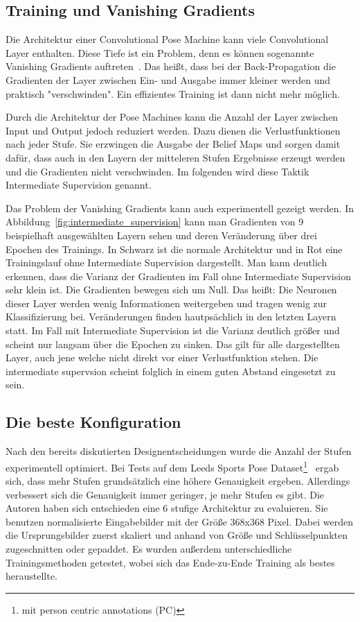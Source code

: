 \documentclass[journal, a4paper]{IEEEtran}
\begin{document}
\subsection{Training und Vanishing Gradients} \label{subsec:vanishing_gradients}

        Die Architektur einer Convolutional Pose Machine kann viele Convolutional Layer enthalten. Diese Tiefe ist ein Problem, denn es können sogenannte Vanishing Gradients auftreten~\cite{pascanu2013difficulty}. Das heißt, dass bei der Back-Propagation die Gradienten der Layer zwischen Ein- und Ausgabe immer kleiner werden und praktisch "verschwinden". Ein effizientes Training ist dann nicht mehr möglich.

        Durch die Architektur der Pose Machines kann die Anzahl der Layer zwischen Input und Output jedoch reduziert werden. Dazu dienen die Verlustfunktionen nach jeder Stufe. Sie erzwingen die Ausgabe der Belief Maps und sorgen damit dafür, dass auch in den Layern der mitteleren Stufen Ergebnisse erzeugt werden und die Gradienten nicht verschwinden. Im folgenden wird diese Taktik Intermediate Supervision genannt.

        Das Problem der Vanishing Gradients kann auch experimentell gezeigt werden. In Abbildung~\ref{fig:intermediate_supervision} kann man Gradienten von 9 beispielhaft ausgewählten Layern sehen und deren Veränderung über drei Epochen des Trainings. In Schwarz ist die normale Architektur und in Rot eine Trainingslauf ohne Intermediate Supervision dargestellt. Man kann deutlich erkennen, dass die Varianz der Gradienten im Fall ohne Intermediate Supervision sehr klein ist. Die Gradienten bewegen sich um Null. Das heißt: Die Neuronen dieser Layer werden wenig Informationen weitergeben und tragen wenig zur Klassifizierung bei. Veränderungen finden hautpsächlich in den letzten Layern statt. Im Fall mit Intermediate Supervision ist die Varianz deutlich größer und scheint nur langsam über die Epochen zu sinken. Das gilt für alle dargestellten Layer, auch jene welche nicht direkt vor einer Verlustfunktion stehen. Die intermediate supervsion scheint folglich in einem guten Abstand eingesetzt zu sein.

\subsection{Die beste Konfiguration}
        
        Nach den bereits diskutierten Designentscheidungen wurde die Anzahl der Stufen experimentell optimiert. Bei Tests auf dem Leeds Sports Pose Dataset\footnote{mit person centric annotations (PC)}~\cite{LSP} ergab sich, dass mehr Stufen grundsätzlich eine höhere Genauigkeit ergeben. Allerdings verbessert sich die Genauigkeit immer geringer, je mehr Stufen es gibt. Die Autoren haben sich entschieden eine 6 stufige Architektur zu evaluieren. Sie benutzen normalisierte Eingabebilder mit der Größe 368x368 Pixel. Dabei werden die Ursprungsbilder zuerst skaliert und anhand von Größe und Schlüsselpunkten zugeschnitten oder gepaddet. Es wurden außerdem unterschiedliche Trainingsmethoden getestet, wobei sich das Ende-zu-Ende Training als bestes heraustellte.
\end{document}
